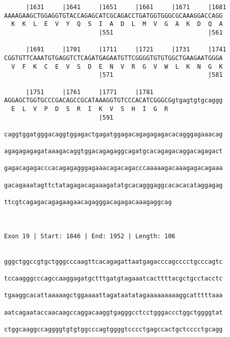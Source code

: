 \documentclass{article}
\begin{document}
\begin{Verbatim}
      |1631     |1641     |1651     |1661     |1671     |1681
AAAAGAAGCTGGAGGTGTACCAGAGCATCGCAGACCTGATGGTGGGCGCAAAGGACCAGG
  K  K  L  E  V  Y  Q  S  I  A  D  L  M  V  G  A  K  D  Q  A
                          |551                          |561
  
      |1691     |1701     |1711     |1721     |1731     |1741
CGGTGTTCAAATGTGAGGTCTCAGATGAGAATGTTCGGGGTGTGTGGCTGAAGAATGGGA
  V  F  K  C  E  V  S  D  E  N  V  R  G  V  W  L  K  N  G  K
                          |571                          |581
  
      |1751     |1761     |1771     |1781                   
AGGAGCTGGTGCCCGACAGCCGCATAAAGGTGTCCCACATCGGGCGgtgagtgtgcaggg
  E  L  V  P  D  S  R  I  K  V  S  H  I  G  R               
                          |591                              
  
caggtggatgggacaggtggagactgagatggagacagagagagacacagggagaaacag
                                                            
agagagagagataaagacaggtggacagagaggcagatgcacagagacaggacagagact
                                                            
gagacagagacccacagagagggagaaacagacagacccaaaaagacaaagagacagaaa
                                                            
gacagaaatagttctatagagacagaaagatatgcacagggaggcacacacataggagag
                                                            
ttcgtcagagacagagaagaacagagggacagagacaaagaggcag
                                              
                                              
 
Exon 19 | Start: 1846 | End: 1952 | Length: 106


gggctggccgtgctgggcccaagttcacagagattaatgagacccagcccctgcccagtc
                                                            
tccaagggcccagccaaggagatgctttgatgtagaaatcacttttacgctgcctacctc
                                                            
tgaaggcacattaaaaagctggaaaattagataatatagaaaaaaaaaggcatttttaaa
                                                            
aatcagaataccaacaagccaggacaaggtgagggcctcctgggaccctggctggggtat
                                                            
ctggcaaggccaggggtgtgtggcccagtggggtcccctgagccactgctcccctgcagg
                                                            

\end{Verbatim}
\end{document}
